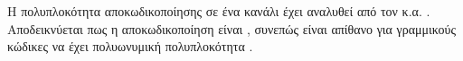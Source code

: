 Η πολυπλοκότητα αποκωδικοποίησης  σε ένα κανάλι  έχει αναλυθεί από τον  κ.α. \cite{berlekamp1978inherent}. Αποδεικνύεται πως η  αποκωδικοποίηση είναι , συνεπώς είναι απίθανο για γραμμικούς κώδικες να έχει πολυωνυμική πολυπλοκότητα \cite{bruck1990hardness}.


